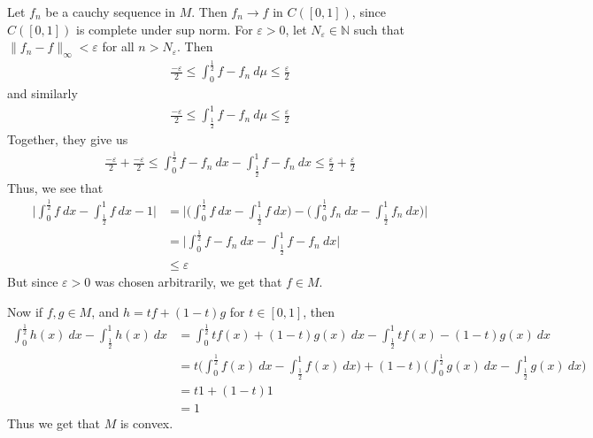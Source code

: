 \documentclass[12pt]{exam}
\theoremstyle{plain} %
\theoremstyle{definition} %
\theoremstyle{remark} %
\begin{document}
\begin{questions}
  \question
  \begin{solution}
    Let $f_n$ be a cauchy sequence in $M$. Then $f_n \to f$ in $C([0,
    1])$, since $C([0, 1])$ is complete under sup norm. For
    $\varepsilon > 0$, let  $N_\varepsilon \in \mathbb{N}$ such that
    $\|f_n - f\|_\infty < \varepsilon$ for all $n > N_\varepsilon$.
    Then
    \begin{align*}
      \frac{-\varepsilon}{2} \le \int_{0}^{\frac{1}{2}} f - f_n \ d
      \mu \le \frac{\varepsilon}{2}
    \end{align*}
    and similarly
    \begin{align*}
      \frac{-\varepsilon}{2} \le \int_{\frac{1}{2}}^{1} f - f_n \ d
      \mu \le \frac{\varepsilon}{2}
    \end{align*}
    Together, they give us
    \begin{align*}
      \frac{-\varepsilon}{2} + \frac{-\varepsilon}{2} \le
      \int_{0}^{\frac{1}{2}} f - f_n \ dx - \int_{\frac{1}{2}}^{1} f - f_n
      \ dx \le \frac{\varepsilon}{2} + \frac{\varepsilon}{2}
    \end{align*}
    Thus, we see that
    \begin{align*}
      \Bigg|\int_{0}^{\frac{1}{2}} f \ dx - \int_{\frac{1}{2}}^{1} f
      \ dx - 1 \Bigg| &= \Bigg|\Big(\int_{0}^{\frac{1}{2}} f \ dx -
      \int_{\frac{1}{2}}^{1} f \ dx \Big) -  \Big(\int_{0}^{\frac{1}{2}} f_n
      \ dx - \int_{\frac{1}{2}}^{1} f_n \ dx \Big) \Bigg|\\
      &= \Bigg| \int_{0}^{\frac{1}{2}} f - f_n \ dx -
      \int_{\frac{1}{2}}^{1} f - f_n \ dx \Bigg| \\
      &\le \varepsilon
    \end{align*}
    But since $\varepsilon > 0$ was chosen arbitrarily, we get that $f \in M$.

    Now if $f, g \in M$, and $h = t f + (1-t) g$ for $ t \in [0, 1]$, then
    \begin{align*}
      \int_{0}^{\frac{1}{2}} h(x) \ dx - \int_{\frac{1}{2}}^{1} h(x)
      \ dx &= \int_{0}^{\frac{1}{2}} t f(x) + (1-t) g(x) \ dx -
      \int_{\frac{1}{2}}^{1} t f(x) - (1-t) g(x)\ dx \\
      &= t \Big(\int_{0}^{\frac{1}{2}} f(x) \ dx -
      \int_{\frac{1}{2}}^{1} f(x) \ dx  \Big) + (1-t)
      \Big(\int_{0}^{\frac{1}{2}} g(x) \ dx - \int_{\frac{1}{2}}^{1}
      g(x) \ dx\Big) \\
      &= t 1 + (1-t)1 \\
      &= 1
    \end{align*}
    Thus we get that $M$ is convex.


\end{solution}
\end{questions}
\end{document}
